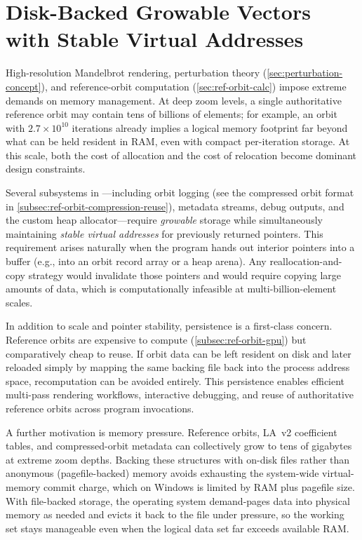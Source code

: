 \section{Disk-Backed Growable Vectors with Stable Virtual Addresses}
\label{sec:disk_backed_growable_vectors}

High-resolution Mandelbrot rendering, perturbation theory (\cref{sec:perturbation-concept}), and reference-orbit computation (\cref{sec:ref-orbit-calc}) impose
extreme demands on memory management. At deep zoom levels, a single authoritative
reference orbit may contain tens of billions of elements; for example, an orbit
with $2.7\times10^{10}$ iterations already implies a logical memory footprint far
beyond what can be held resident in RAM, even with compact per-iteration storage.
At this scale, both the cost of allocation and the cost of relocation become
dominant design constraints.

Several subsystems in \FractalShark{}—including orbit logging (see the compressed orbit format in \cref{subsec:ref-orbit-compression-reuse}), metadata streams,
debug outputs, and the custom heap allocator—require \emph{growable} storage
while simultaneously maintaining \emph{stable virtual addresses} for previously
returned pointers. This requirement arises naturally when the program hands out
interior pointers into a buffer (e.g., into an orbit record array or a heap
arena). Any reallocation-and-copy strategy would invalidate those pointers and
would require copying large amounts of data, which is computationally
infeasible at multi-billion-element scales.

In addition to scale and pointer stability, persistence is a first-class
concern. Reference orbits are expensive to compute (\cref{subsec:ref-orbit-gpu}) but comparatively cheap to
reuse. If orbit data can be left resident on disk and later reloaded simply by
mapping the same backing file back into the process address space, recomputation
can be avoided entirely. This persistence enables efficient multi-pass rendering workflows,
interactive debugging, and reuse of authoritative reference orbits across program
invocations.

A further motivation is memory pressure.  Reference orbits, LA~v2
coefficient tables, and compressed-orbit metadata can collectively
grow to tens of gigabytes at extreme zoom depths.  Backing these
structures with on-disk files rather than anonymous (pagefile-backed)
memory avoids exhausting the system-wide virtual-memory commit charge,
which on Windows is limited by RAM plus pagefile size.  With
file-backed storage, the operating system demand-pages data into
physical memory as needed and evicts it back to the file under
pressure, so the working set stays manageable even when the logical
data set far exceeds available RAM.

